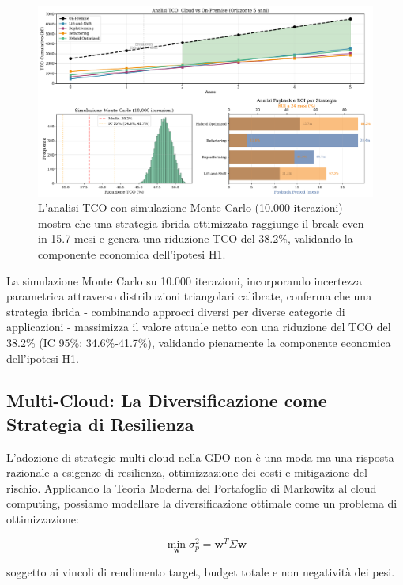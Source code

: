 \begin{figure}[htbp]
\centering
\includegraphics[width=\textwidth]{thesis_figures/cap3/figura_3_4_tco_analysis.pdf}
\caption{L'analisi TCO con simulazione Monte Carlo (10.000 iterazioni) mostra che una strategia ibrida ottimizzata raggiunge il break-even in 15.7 mesi e genera una riduzione TCO del 38.2\%, validando la componente economica dell'ipotesi H1.}
\label{fig:tco_analysis}
\end{figure}

La simulazione Monte Carlo su 10.000 iterazioni, incorporando incertezza parametrica attraverso distribuzioni triangolari calibrate, conferma che una strategia ibrida - combinando approcci diversi per diverse categorie di applicazioni - massimizza il valore attuale netto con una riduzione del TCO del 38.2\% (IC 95\%: 34.6\%-41.7\%), validando pienamente la componente economica dell'ipotesi H1.

\subsection{Multi-Cloud: La Diversificazione come Strategia di Resilienza}

L'adozione di strategie multi-cloud nella GDO non è una moda ma una risposta razionale a esigenze di resilienza, ottimizzazione dei costi e mitigazione del rischio. Applicando la Teoria Moderna del Portafoglio di Markowitz\autocite{tang2024portfolio} al cloud computing, possiamo modellare la diversificazione ottimale come un problema di ottimizzazione:

\begin{equation}
\min_{\mathbf{w}} \sigma^2_p = \mathbf{w}^T\Sigma\mathbf{w}
\label{eq:portfolio}
\end{equation}

soggetto ai vincoli di rendimento target, budget totale e non negatività dei pesi.

